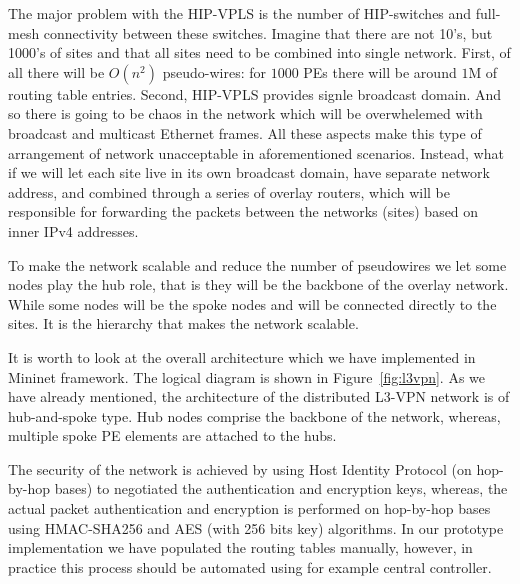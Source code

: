 The major problem with the HIP-VPLS is the number of HIP-switches and
full-mesh connectivity between these switches. Imagine that there are 
not 10's, but 1000's of sites and that all sites need to be 
combined into single network. First, of all there will be 
$O(n^2)$ pseudo-wires: for $1000$ PEs there will be  
around $1$M of routing table entries. Second, HIP-VPLS provides 
signle broadcast domain. And so there is going to be 
chaos in the network which will be overwhelemed with broadcast
and multicast Ethernet frames. All these aspects make this type of
arrangement of network unacceptable in aforementioned scenarios.
Instead, what if we will let each site live in its own broadcast
domain, \ie have separate network address, and combined through 
a series of overlay routers, which will be responsible for 
forwarding the packets between the networks (sites) based on 
inner IPv4 addresses. 

To make the network scalable and reduce the number of pseudowires
we let some nodes play the hub role, that is they will be the backbone 
of the overlay network. While some nodes will be the spoke nodes
and will be connected directly to the sites. It is the hierarchy 
that makes the network scalable. 

It is worth to look at the overall architecture which we have implemented in
Mininet framework. The logical diagram is shown in Figure~\ref{fig:l3vpn}. 
As we have already mentioned, the architecture of the distributed 
L3-VPN network is of hub-and-spoke type. Hub nodes comprise the backbone of the network, whereas,
multiple spoke PE elements are attached to the hubs. 

The security of the network is achieved by using Host Identity Protocol (on hop-by-hop bases) to negotiated
the authentication and encryption keys, whereas, the actual packet authentication
and encryption is performed on hop-by-hop bases using HMAC-SHA256
and AES (with 256 bits key) algorithms. In our prototype implementation we 
have populated the routing tables manually, however, in practice this 
process should be automated using for example central controller. 

